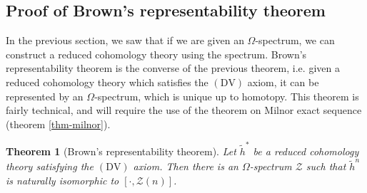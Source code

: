 \documentclass[12pt, notitlepage]{article}
\newtheorem{thm}{Theorem}[section]
\theoremstyle{definition}
\newcommand{\calz}{\mathcal{Z}}
\newcommand{\redco}{\widetilde{h}}
\newcommand{\dv}{\mathrm{DV}}
\begin{document}

\subsection{Proof of Brown's representability theorem}
\label{sec:proof-browns-repr}

In the previous section, we saw that if we are given an $\Omega$-spectrum, we can construct a
reduced cohomology theory using the spectrum. Brown's representability theorem is the converse of
the previous theorem, i.e. given a reduced cohomology theory which satisfies the $(\dv)$ axiom, it
can be represented by an $\Omega$-spectrum, which is unique up to homotopy. This theorem is fairly
technical, and will require the use of the theorem on Milnor exact sequence (theorem
\ref{thm-milnor}).

\begin{thm}[Brown's representability theorem]
  Let $\redco^{\ast}$ be a reduced cohomology theory satisfying the $(\dv)$ axiom. Then there is an
  $\Omega$-spectrum $\calz$ such that $\redco^{n}$ is naturally isomorphic to
  $\left[\cdot, \calz(n) \right]$.
\end{thm}
\end{document}
